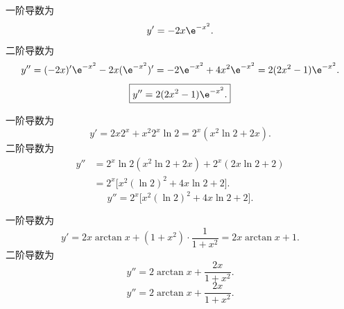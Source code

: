 \begin{solution}

    一阶导数为
    \begin{equation}
        y' = -2x \e^{-x^2}.
    \end{equation}
    二阶导数为
    \begin{equation}
        y'' = (-2x)' \e^{-x^2} - 2x (\e^{-x^2})' = -2\e^{-x^2} + 4x^2 \e^{-x^2} = 2(2x^2 - 1)\e^{-x^2}.
    \end{equation}
    \begin{equation}
        \boxed{y'' = 2(2x^2 - 1)\e^{-x^2}.}
    \end{equation}


    一阶导数为
    \begin{equation}
        y' = 2x 2^x + x^2 2^x \ln 2 = 2^x (x^2 \ln 2 + 2x).
    \end{equation}
    二阶导数为
    \begin{equation}
        \begin{aligned}
            y'' & = 2^x \ln 2 (x^2 \ln 2 + 2x) + 2^x (2x \ln 2 + 2) \\
                & = 2^x \bigl[ x^2 (\ln 2)^2 + 4x \ln 2 + 2 \bigr].
        \end{aligned}
    \end{equation}
    \begin{equation}
        \boxed{y'' = 2^x \bigl[ x^2 (\ln 2)^2 + 4x \ln 2 + 2 \bigr].}
    \end{equation}


    一阶导数为
    \begin{equation}
        y' = 2x \arctan x + (1 + x^2) \cdot \frac{1}{1 + x^2} = 2x \arctan x + 1.
    \end{equation}
    二阶导数为
    \begin{equation}
        y'' = 2\arctan x + \frac{2x}{1 + x^2}.
    \end{equation}
    \begin{equation}
        \boxed{y'' = 2\arctan x + \frac{2x}{1 + x^2}.}
    \end{equation}



\end{solution}
